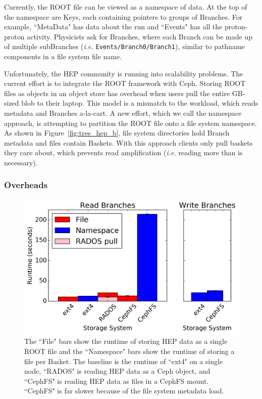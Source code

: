 Currently, the ROOT file can be viewed as a namespace of data. At the top of
the namespace are Keys, each containing pointers to groups of Branches. For
example, ``MetaData" has data about the run and ``Events" has all the
proton-proton activity. Physicists ask for Branches, where each Branch can be
made up of multiple subBranches ({\it i.e.} \texttt{Events/Branch0/Branch1}),
similar to pathname components in a file system file name. 

Unfortunately, the HEP community is running into scalability problems.  The
current effort is to integrate the ROOT framework with Ceph.  Storing ROOT
files as objects in an object store has overhead when users pull the entire
GB-sized blob to their laptop.  This model is a mismatch to the workload, which
reads metadata and Branches a-la-cart. A new effort, which we call the
namespace approach, is attempting to partition the ROOT file onto a file system
namespace. As shown in Figure~\ref{fig:tree_hep_b}, file system directories
hold Branch metadata and files contain Baskets. With this approach clients only
pull baskets they care about, which prevents read amplification ({\it i.e.}
reading more than is necessary).


\subsubsection{Overheads}

\begin{figure}[tb]
\centering
  \includegraphics[width=1\linewidth]{figures/hep_runtime.png}
  \caption{The ``File" bars show the runtime of storing HEP data as a single
ROOT file and the ``Namespace" bars show the runtime of storing a file per
Basket. The baseline is the runtime of ``ext4" on a single node, ``RADOS" is
reading HEP data as a Ceph object, and ``CephFS" is reading HEP data as files
in a CephFS mount. ``CephFS" is far slower because of the file system metadata
load.}
  \label{fig:hep_runtime}
\end{figure}

